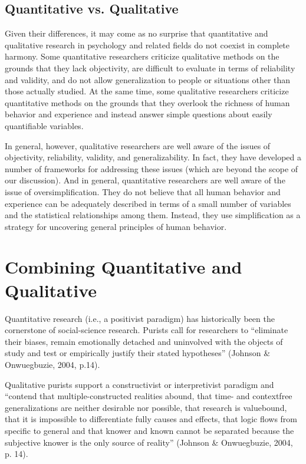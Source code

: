 \subsection{Quantitative vs. Qualitative}

Given their differences, it may come as no surprise that quantitative and qualitative research in psychology and related fields do not coexist in complete harmony. Some quantitative researchers criticize qualitative methods on the grounds that they lack objectivity, are difficult to evaluate in terms of reliability and validity, and do not allow generalization to people or situations other than those actually studied. At the same time, some qualitative researchers criticize quantitative methods on the grounds that they overlook the richness of human behavior and experience and instead answer simple questions about easily quantifiable variables.

In general, however, qualitative researchers are well aware of the issues of objectivity, reliability, validity, and generalizability. In fact, they have developed a number of frameworks for addressing these issues (which are beyond the scope of our discussion). And in general, quantitative researchers are well aware of the issue of oversimplification. They do not believe that all human behavior and experience can be adequately described in terms of a small number of variables and the statistical relationships among them. Instead, they use simplification as a strategy for uncovering general principles of human behavior.


\section{Combining Quantitative and Qualitative}

Quantitative research (i.e., a positivist paradigm) has historically been the
cornerstone of social-science research. Purists call for researchers to
“eliminate their biases, remain emotionally detached and uninvolved with the
objects of study and test or empirically justify their stated hypotheses”
(Johnson \& Onwuegbuzie, 2004, p.14).

Qualitative purists support a constructivist or interpretivist paradigm and
“contend that multiple-constructed realities abound, that time- and contextfree
generalizations are neither desirable nor possible, that research is valuebound,
that it is impossible to differentiate fully causes and effects, that logic
flows from specific to general and that knower and known cannot be
separated because the subjective knower is the only source of reality”
(Johnson \& Onwuegbuzie, 2004, p. 14).

